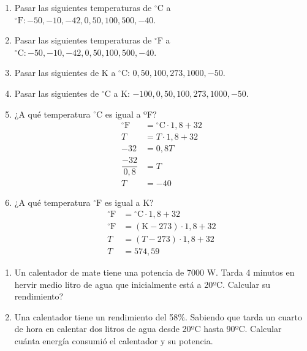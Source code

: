 \begin{enumerate}
\item Pasar las siguientes temperaturas de $^\circ$C a $^\circ\text{F}: -50, -10, -42, 0, 50, 100, 500, -40$.

\item Pasar las siguientes temperaturas de $^\circ$F a $^\circ\text{C}: -50, -10, -42, 0, 50, 100, 500, -40$.

\item Pasar las siguientes de K a $^\circ$C: $0, 50, 100, 273, 1000, -50$.

\item Pasar las siguientes de $^\circ$C a K: $-100, 0, 50, 100, 273, 1000, -50$.

\item ¿A qué temperatura $\text{$^\circ$C}$ es igual a ºF?
\begin{align*}
    ^\circ\text{F}&= \text{$^\circ$C} \cdot 1,8 + 32\\
    T &= T \cdot 1,8 + 32\\
    -32 &= 0,8 T\\
    \dfrac{-32}{0,8} &= T\\
    T &= -40
\end{align*}

\item ¿A qué temperatura $\text{$^\circ$F}$ es igual a K?
\begin{align*}
    ^\circ\text{F}&= \text{$^\circ$C} \cdot 1,8 + 32\\
    ^\circ\text{F}&= (\text{K}-273) \cdot 1,8 + 32\\
    T&= (T-273) \cdot 1,8 + 32\\
    T &= 574,59
\end{align*}
\end{enumerate}

\begin{enumerate}
    \item Un calentador de mate tiene una potencia de 7000 W. Tarda 4 minutos en hervir medio litro de agua que inicialmente está a 20ºC. Calcular su rendimiento?

    \item Una calentador tiene un rendimiento del 58\%. Sabiendo que tarda un cuarto de hora en calentar dos litros de agua desde 20ºC hasta 90ºC. Calcular cuánta energía consumió el calentador y su potencia.
\end{enumerate}
